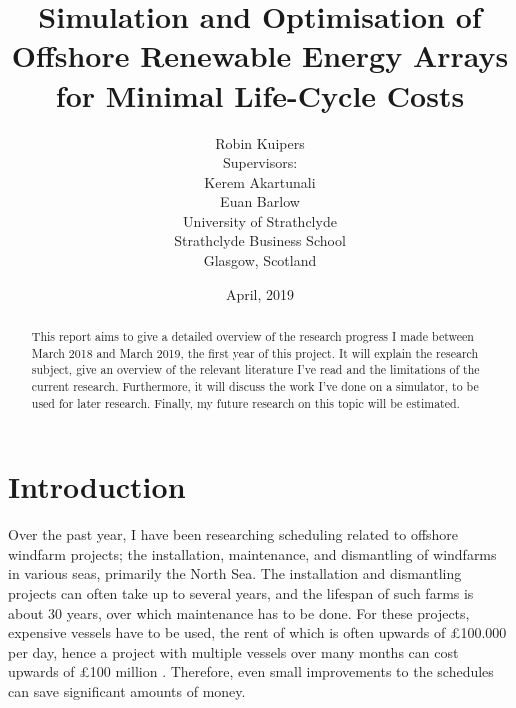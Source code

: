 \documentclass[a4paper,12pt]{article}
\begin{document}
\title{Simulation and Optimisation of Offshore Renewable Energy Arrays for Minimal Life-Cycle Costs}
\author{Robin Kuipers \\[1cm] Supervisors: \\ Kerem Akartunali \\ Euan Barlow\\[2cm] University of Strathclyde \\ Strathclyde Business School \\ {\small Glasgow, Scotland}}
\date{April, 2019}

\maketitle

\pagebreak

\begin{abstract}
This report aims to give a detailed overview of the research progress I made between March 2018 and March 2019, the first year of this project. It will explain the research subject, give an overview of the relevant literature I've read and the limitations of the current research. Furthermore, it will discuss the work I've done on a simulator, to be used for later research. Finally, my future research on this topic will be estimated. 
\end{abstract}

\pagebreak

\tableofcontents

\pagebreak

\section{Introduction} \label{s:intro}
Over the past year, I have been researching scheduling related to offshore windfarm projects; the installation, maintenance, and dismantling of windfarms in various seas, primarily the North Sea. The installation and dismantling projects can often take up to several years, and the lifespan of such farms is about 30 years, over which maintenance has to be done. For these projects, expensive vessels have to be used, the rent of which is often upwards of \pounds 100.000 per day\cite{barlow2014support}, hence a project with multiple vessels over many months can cost upwards of \pounds 100 million \cite{kaiser2010offshore}. Therefore, even small improvements to the schedules can save significant amounts of money.
\end{document}
